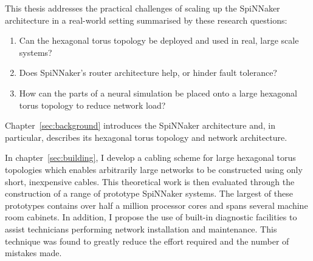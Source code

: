 %

This thesis addresses the practical challenges of scaling up the SpiNNaker
architecture in a real-world setting summarised by these research questions:

\begin{enumerate}
	
	\item Can the hexagonal torus topology be deployed and used in real, large
	scale systems?
	
	\item Does SpiNNaker's router architecture help, or hinder fault tolerance?
	
	\item How can the parts of a neural simulation be placed onto a large
	hexagonal torus topology to reduce network load?
	
\end{enumerate}

%

Chapter~\ref{sec:background} introduces the SpiNNaker architecture and, in
particular, describes its hexagonal torus topology and network architecture.

In chapter~\ref{sec:building}, I develop a cabling scheme for large hexagonal
torus topologies which enables arbitrarily large networks to be constructed
using only short, inexpensive cables. This theoretical work is then evaluated
through the construction of a range of prototype SpiNNaker systems. The largest
of these prototypes contains over half a million processor cores and spans
several machine room cabinets. In addition, I propose the use of built-in
diagnostic facilities to assist technicians performing network installation and
maintenance. This technique was found to greatly reduce the effort required and
the number of mistakes made.

